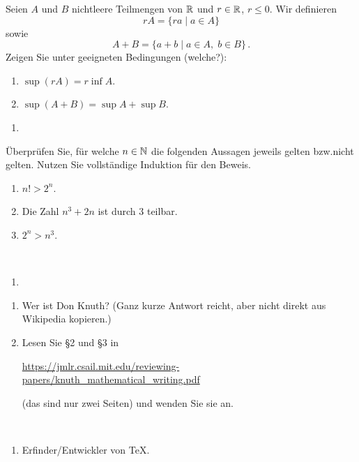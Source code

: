 \begin{aufg}[6 Punkte]
Seien $A$ und $B$ nichtleere Teilmengen von $\mathbb{R}$ und $r\in\mathbb{R}$, $r\leq 0$. Wir definieren 
\[
rA = \lbrace ra \mid a\in A\rbrace
\]
sowie
\[
A+B = \lbrace a+b \mid a\in A, \; b\in B \rbrace\,.
\]
Zeigen Sie unter geeigneten Bedingungen (welche?):
\begin{enumerate}[label=$\mathrm{(\roman*)}$, ref=$\mathrm{\roman*}$]
\item $\sup(rA) = r\inf A$.
\item $\sup(A+B) = \sup A + \sup B$.
\end{enumerate}
\end{aufg}


\bigskip

\begin{lsg}
\begin{enumerate}[label=$\mathrm{(\roman*)}$, ref=$\mathrm{\roman*}$]
\item 
\end{enumerate}
\end{lsg}


\bigskip


\begin{aufg}[6 Punkte] \"Uberpr\"ufen Sie, f\"ur welche $n\in\mathbb{N}$ die folgenden Aussagen jeweils gelten bzw.\@ nicht gelten. Nutzen Sie vollst\"andige Induktion f\"ur den Beweis.
\begin{enumerate}[label=$\mathrm{(\roman*)}$, ref=$\mathrm{\roman*}$]
\item $n!>2^n$.
\item Die Zahl $n^3+2n$ ist durch $3$ teilbar.
\item $2^n > n^3$.
\end{enumerate}
\end{aufg}
 
\bigskip

\begin{lsg}\mbox{ }
\begin{enumerate}[label=$\mathrm{(\roman*)}$, ref=$\mathrm{\roman*}$]
\item 
\end{enumerate}
\end{lsg}


\bigskip

\begin{aufg} \mbox{}
\begin{enumerate}[label=$\mathrm{(\roman*)}$, ref=$\mathrm{\roman*}$]
\item Wer ist Don Knuth? (Ganz kurze Antwort reicht, aber nicht direkt aus Wikipedia kopieren.)
\item Lesen Sie §2 und §3 in
\begin{center}
 \url{https://jmlr.csail.mit.edu/reviewing-papers/knuth_mathematical_writing.pdf}
\end{center}
(das sind nur zwei Seiten) und wenden Sie sie an.
\end{enumerate}
\end{aufg}

\bigskip

\begin{lsg}\mbox{ }
\begin{enumerate}[label=$\mathrm{(\roman*)}$, ref=$\mathrm{\roman*}$]
\item Erfinder/Entwickler von TeX.
\end{enumerate}
\end{lsg}

